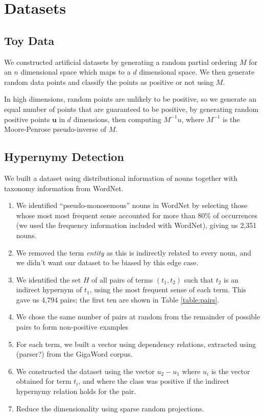 \section{Datasets}

\subsection{Toy Data}

We constructed artificial datasets by generating a random partial
ordering $M$ for an $n$ dimensional space which maps to a $d$
dimensional space. We then generate random data points and classify
the points as positive or not using $M$.

In high dimensions, random points are unlikely to be positive, so we
generate an equal number of points that are guaranteed to be positive,
by generating random positive points $\mathbf{u}$ in $d$ dimensions,
then computing $M^{-1}u$, where $M^{-1}$ is the Moore-Penrose
pseudo-inverse of $M$.

\subsection{Hypernymy Detection}

We built a dataset using distributional information of nouns together
with taxonomy information from WordNet.
\begin{enumerate}
\item We identified ``pseudo-monosemous'' nouns in WordNet by
  selecting those whose most most frequent sense accounted for more
  than 80\% of occurrences (we used the frequency information included
  with WordNet), giving us 2,351 nouns.
\item We removed the term \emph{entity} as this is indirectly related
  to every noun, and we didn't want our dataset to be biased by this
  edge case.
\item We identified the set $H$ of all pairs of terms $(t_1, t_2)$
  such that $t_2$ is an indirect hypernym of $t_1$, using the most
  frequent sense of each term. This gave us 4,794 pairs; the first ten
  are shown in Table \ref{table:pairs}.
\item We chose the same number of pairs at random from the remainder
  of possible pairs to form non-positive examples
\item For each term, we built a vector using dependency relations,
  extracted using (parser?) from the GigaWord corpus.
\item We constructed the dataset using the vector $u_2 - u_1$ where
  $u_i$ is the vector obtained for term $t_i$, and where the class was
  positive if the indirect hypernymy relation holds for the pair.
\item Reduce the dimensionality using sparse random projections.
\end{enumerate}

